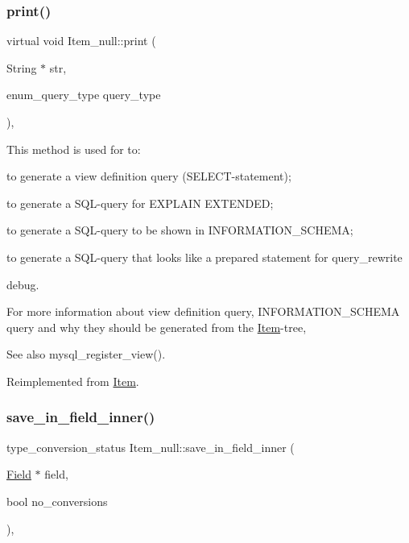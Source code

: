 \subsubsection{\texorpdfstring{print()}{print()}}
{\footnotesize\ttfamily virtual void Item\+\_\+null\+::print (\begin{DoxyParamCaption}\item[{String $\ast$}]{str,  }\item[{enum\+\_\+query\+\_\+type}]{query\+\_\+type }\end{DoxyParamCaption})\hspace{0.3cm}{\ttfamily [inline]}, {\ttfamily [virtual]}}

This method is used for to\+:
\begin{DoxyItemize}
\item to generate a view definition query (S\+E\+L\+E\+CT-\/statement);
\item to generate a S\+QL-\/query for E\+X\+P\+L\+A\+IN E\+X\+T\+E\+N\+D\+ED;
\item to generate a S\+QL-\/query to be shown in I\+N\+F\+O\+R\+M\+A\+T\+I\+O\+N\+\_\+\+S\+C\+H\+E\+MA;
\item to generate a S\+QL-\/query that looks like a prepared statement for query\+\_\+rewrite
\item debug.
\end{DoxyItemize}

For more information about view definition query, I\+N\+F\+O\+R\+M\+A\+T\+I\+O\+N\+\_\+\+S\+C\+H\+E\+MA query and why they should be generated from the \mbox{\hyperlink{classItem}{Item}}-\/tree, \begin{DoxySeeAlso}{See also}
mysql\+\_\+register\+\_\+view(). 
\end{DoxySeeAlso}


Reimplemented from \mbox{\hyperlink{classItem_aa7ba4bde739d83adec8edf3bf1596d94}{Item}}.

\mbox{\label{classItem__null_af63975b9d3bea7f7a09bcaf0dc5da860}} 
\subsubsection{\texorpdfstring{save\+\_\+in\+\_\+field\+\_\+inner()}{save\_in\_field\_inner()}}
{\footnotesize\ttfamily type\+\_\+conversion\+\_\+status Item\+\_\+null\+::save\+\_\+in\+\_\+field\+\_\+inner (\begin{DoxyParamCaption}\item[{\mbox{\hyperlink{classField}{Field}} $\ast$}]{field,  }\item[{bool}]{no\+\_\+conversions }\end{DoxyParamCaption})\hspace{0.3cm}{\ttfamily [protected]}, {\ttfamily [virtual]}}

